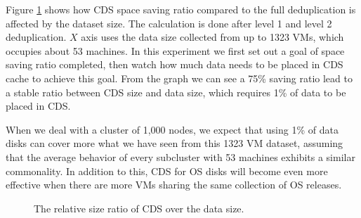 Figure \ref{fig:datacds} shows how CDS space saving ratio
compared to the full deduplication is affected by the dataset size. 
The calculation is done after level 1 and level 2 deduplication.
$X$ axis uses the data size collected  from up to 1323 VMs, which occupies about
53 machines. 
In this experiment we first set out a goal of space saving ratio completed, 
then watch how much data needs to be placed in CDS cache to achieve this goal.
From the graph we can see a 75\% saving ratio lead to a stable ratio between 
CDS size and data size, which requires 1\% of data to be placed in CDS.

When we deal with a cluster of 1,000 nodes, we expect that using
1\% of data disks can cover more what we have seen from this
1323 VM dataset, assuming that the average behavior of every subcluster with 53 machines
exhibits a similar commonality. 
In addition to this, CDS for OS disks will become even more effective when
there are more VMs sharing the same collection of OS releases. 

\begin{figure}
  \centering
  \caption{The relative size ratio of  CDS over the data size. }
  \label{fig:datacds}
\end{figure}

